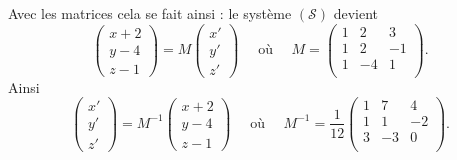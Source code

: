 {\begin{enumerate}
{\bigskip

Avec les matrices cela se fait ainsi :
le système $(\mathcal{S})$ devient
$$\begin{pmatrix} x+2 \\ y-4 \\ z-1 \end{pmatrix}= M \begin{pmatrix} x' \\ y' \\ z' \end{pmatrix}
\quad \text{ où } \quad 
M = \begin{pmatrix}
     1 & 2 & 3 \\ 1 & 2 & -1 \\ 1 & -4 & 1 \\
    \end{pmatrix}.
$$
Ainsi
$$\begin{pmatrix} x' \\ y' \\ z' \end{pmatrix}= M^{-1} \begin{pmatrix} x+2 \\ y-4 \\ z-1 \end{pmatrix}
\quad \text{ où } \quad 
M^{-1} = \frac{1}{12}\begin{pmatrix}
     1 & 7 & 4 \\ 1 & 1 & -2 \\ 3 & -3 & 0 \\
    \end{pmatrix}.
$$}
\end{enumerate}
}